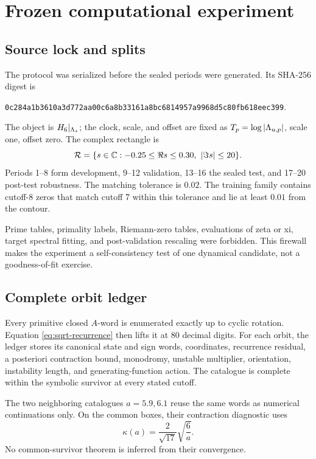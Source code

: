 \section{Frozen computational experiment}
\label{sec:experiment}

\subsection{Source lock and splits}

The protocol was serialized before the sealed periods were generated.  Its
SHA-256 digest is
\begin{center}
\small\texttt{0c284a1b3610a3d772aa00c6a8b33161a8bc6814957a9968d5c80fb618eec399}.
\end{center}
The object is \(H_6|_{\Lambda_*}\); the clock, scale, and offset are fixed as
\(T_p=\log\left|\Lambda_{u,p}\right|\), scale one, offset zero.  The complex
rectangle is
\[
 \mathcal{R}=\{s\in\mathbb{C}:-0.25\le\Re s\le0.30,\ \left|\Im s\right|\le20\}.
\]
Periods 1--8 form development, 9--12 validation, 13--16 the sealed test, and
17--20 post-test robustness.  The matching tolerance is \(0.02\).  The
training family contains cutoff-8 zeros that match cutoff 7 within this
tolerance and lie at least \(0.01\) from the contour.

Prime tables, primality labels, Riemann-zero tables, evaluations of zeta or xi,
target spectral fitting, and post-validation rescaling were forbidden.  This
firewall makes the experiment a self-consistency test of one dynamical
candidate, not a goodness-of-fit exercise.

\subsection{Complete orbit ledger}

Every primitive closed \(A\)-word is enumerated exactly up to cyclic rotation.
Equation \eqref{eq:sqrt-recurrence} then lifts it at 80 decimal digits.  For
each orbit, the ledger stores its canonical state and sign words, coordinates,
recurrence residual, a posteriori contraction bound, monodromy, unstable
multiplier, orientation, instability length, and generating-function action.
The catalogue is complete within the symbolic survivor at every stated
cutoff.

The two neighboring catalogues \(a=5.9,6.1\) reuse the same words as numerical
continuations only.  On the common boxes, their contraction diagnostic uses
\[
 \kappa(a)=\frac{2}{\sqrt{17}}\sqrt{\frac6a}.
\]
No common-survivor theorem is inferred from their convergence.

